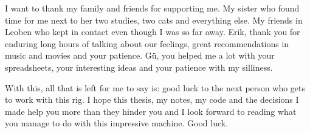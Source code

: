 I want to thank my family and friends for supporting me. My sister who found time for me next to her two studies, two cats and everything else. My friends in Leoben who kept in contact even though I was so far away.
Erik, thank you for enduring long hours of talking about our feelings, great recommendations in music and movies and your patience.
Gü, you helped me a lot with your spreadsheets, your interesting ideas and your patience with my silliness. 

With this, all that is left for me to say is: good luck to the next person who gets to work with this rig. I hope this thesis, my notes, my code and the decisions I made help you more than they hinder you and I look forward to reading what you manage to do with this impressive machine. Good luck.